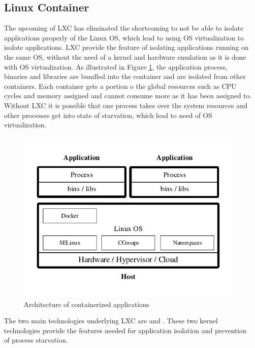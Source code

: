 \subsection{Linux Container}
\label{sec:docker-linux-container}
The upcoming of LXC has eliminated the shortcoming to not be able to isolate applications properly of the Linux OS, which lead to using OS virtualization to isolate applications. LXC provide the feature of isolating applications running on the same OS, without the need of a kernel and hardware emulation as it is done with OS virtualization. As illustrated in Figure \ref{fig:docker-container-architecture}, the application process, binaries and libraries are bundled into the container and are isolated from other containers. Each container gets a portion o the global resources such as CPU cycles and memory assigned and cannot consume more as it has been assigned to. Without LXC it is possible that one process takes over the system resources and other processes get into state of starvation, which lead to need of OS virtualization. 

\begin{figure}[htbp]
	\centering
	\includegraphics[scale=0.8]{images/docker-containerized-architecture.pdf}
	\caption{Architecture of containerized applications}
	\label{fig:docker-container-architecture}
\end{figure} 

The two main technologies underlying LXC are  and . These two kernel technologies provide the features needed for application isolation and prevention of process starvation.

